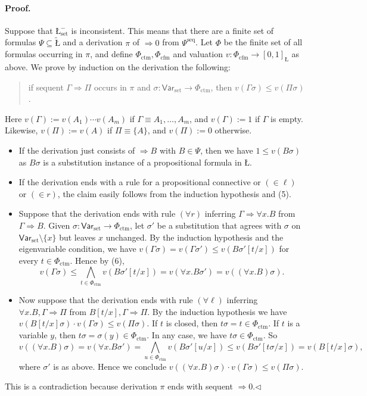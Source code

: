 \documentclass[10pt,a4paper]{article}
\newcommand{\Luk}{\text{\L}}
\begin{document}
\paragraph{Proof.} Suppose that $\Luk_{\mathrm{set}}^{-}$ is inconsistent. This means that there are a finite set of formulas $\Psi\subseteq\widetilde{\Luk}$ and a derivation $\pi$ of $\Rightarrow0$ from $\Psi^{\mathrm{seq}}$. Let $\Phi$ be the finite set of all formulas occurring in $\pi$, and define $\Phi_{\mathrm{ctm}},\Phi_{\mathrm{cfm}}$ and valuation $v:\Phi_{\mathrm{cfm}}\to[0,1]_{\Luk}$ as above.
We prove by induction on the derivation the following:
\begin{quote}
if sequent $\Gamma\Rightarrow\Pi$ occurs in $\pi$ and $\sigma:\mathsf{Var}_{\mathrm{set}}\to\Phi_{\mathrm{ctm}}$, then $v(\Gamma\sigma)\le v(\Pi\sigma)$.
\end{quote}
Here $v(\Gamma):=v(A_1)\cdots v(A_m)$ if $\Gamma\equiv A_1,\ldots,A_m$, and $v(\Gamma):=1$ if $\Gamma$ is empty. Likewise, $v(\Pi):=v(A)$ if $\Pi\equiv\{A\}$, and $v(\Pi):=0$ otherwise.
\begin{itemize}
\item If the derivation just consists of $\Rightarrow B$ with $B\in\Psi$, then we have $1\le v(B\sigma)$ as $B\sigma$ is a substitution instance of a propositional formula in $\Luk$.
\item If the derivation ends with a rule for a propositional connective or $(\in\ell)$ or $(\in r)$, the claim easily follows from the induction hypothesis and (5).
\item Suppose that the derivation ends with rule $(\forall r)$ inferring $\Gamma\Rightarrow\forall x.B$ from $\Gamma\Rightarrow B$. Given $\sigma:\mathsf{Var}_{\mathrm{set}}\to\Phi_{\mathrm{ctm}}$, let $\sigma'$ be a substitution that agrees with $\sigma$ on $\mathsf{Var}_{\mathrm{set}}\setminus\{x\}$ but leaves $x$ unchanged. By the induction hypothesis and the eigenvariable condition, we have $v(\Gamma\sigma)=v(\Gamma\sigma')\le v(B\sigma'[t/x])$ for every $t\in\Phi_{\mathrm{ctm}}$. Hence by (6),
\[
 v(\Gamma\sigma)\le\bigwedge_{t\in\Phi_{\mathrm{ctm}}}v(B\sigma'[t/x])
 =v(\forall x.B\sigma')=v((\forall x.B)\sigma).
\]
\item Now suppose that the derivation ends with rule $(\forall\ell)$ inferring $\forall x.B,\Gamma\Rightarrow\Pi$ from $B[t/x],\Gamma\Rightarrow\Pi$. By the induction hypothesis we have $v(B[t/x]\sigma)\cdot v(\Gamma\sigma)\le v(\Pi\sigma)$.
If $t$ is closed, then $t\sigma=t\in\Phi_{\mathrm{ctm}}$. If $t$ is a variable $y$, then $t\sigma=\sigma(y)\in\Phi_{\mathrm{ctm}}$. In any case, we have $t\sigma\in\Phi_{\mathrm{ctm}}$. So
\[
 v((\forall x.B)\sigma)=v(\forall x.B\sigma')=\bigwedge_{u\in\Phi_{\mathrm{ctm}}}v(B\sigma'[u/x])
 \le v(B\sigma'[t\sigma/x])=v(B[t/x]\sigma),
\]
where $\sigma'$ is as above. Hence we conclude $v((\forall x.B)\sigma)\cdot v(\Gamma\sigma)\le v(\Pi\sigma)$.
\end{itemize}
This is a contradiction because derivation $\pi$ ends with sequent $\Rightarrow0$.\hfill$\triangleleft$
\end{document}
